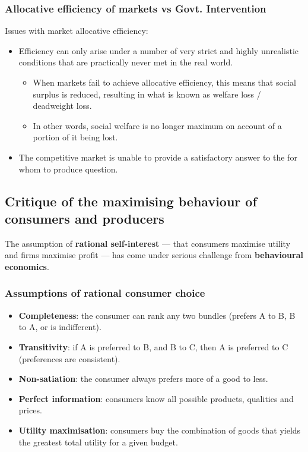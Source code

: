 \documentclass[a4paper,12pt]{article}
\begin{document}
\subsubsection*{Allocative efficiency of markets vs Govt. Intervention}
Issues with market allocative efficiency:
\begin{itemize}
  \item Efficiency can only arise under a number of very strict and highly unrealistic conditions that are practically never met in the real world.
  \begin{itemize}
    \item When markets fail to achieve allocative efficiency, this means that social surplus is reduced, resulting in what is known as welfare loss / deadweight loss.
    \item In other words, social welfare is no longer maximum on account of a portion of it being lost.
  \end{itemize}
  \item The competitive market is unable to provide a satisfactory answer to the for whom to produce question.
\end{itemize}
\subsection{Critique of the maximising behaviour of consumers and producers}
The assumption of \textbf{rational self-interest} --- that consumers maximise utility and firms maximise profit --- has come under serious challenge from \textbf{behavioural economics}.
\subsubsection*{Assumptions of rational consumer choice}
\begin{itemize}
  \item \textbf{Completeness}: the consumer can rank any two bundles (prefers A to B, B to A, or is indifferent).
  \item \textbf{Transitivity}: if A is preferred to B, and B to C, then A is preferred to C (preferences are consistent).
  \item \textbf{Non-satiation}: the consumer always prefers more of a good to less.
  \item \textbf{Perfect information}: consumers know all possible products, qualities and prices.
  \item \textbf{Utility maximisation}: consumers buy the combination of goods that yields the greatest total utility for a given budget.
\end{itemize}
\end{document}
